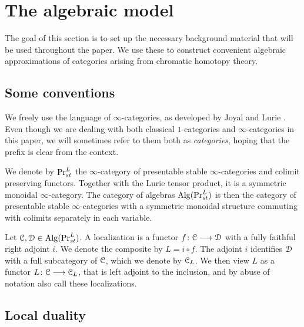 
\section{The algebraic model}

The goal of this section is to set up the necessary background material that will be used throughout the paper. We use these to construct convenient algebraic approximations of categories arising from chromatic homotopy theory. 

\subsection*{Some conventions}

We freely use the language of $\infty$-categories, as developed by Joyal \cite{joyal_02} and Lurie \cite{lurie_09, Lurie_HA}. Even though we are dealing with both classical $1$-categories and $\infty$-categories in this paper, we will sometimes refer to them both as \emph{categories}, hoping that the prefix is clear from the context. 

We denote by $\mathrm{Pr}_{st}^L$ the $\infty$-category of presentable stable $\infty$-categories and colimit preserving functors. Together with the Lurie tensor product, it is a symmetric monoidal $\infty$-category. The category of algebras $\operatorname{Alg}(\mathrm{Pr}_{st}^L)$ is then the category of presentable stable $\infty$-categories with a symmetric monoidal structure commuting with colimits separately in each variable. 

Let $\EuScript{C}, \EuScript{D}\in \operatorname{Alg}(\mathrm{Pr}_{st}^L)$. A localization is a functor $f\colon \EuScript{C}\longrightarrow \EuScript{D}$ with a fully faithful right adjoint $i$. We denote the composite by $L= i\circ f$. The adjoint $i$ identifies $\EuScript{D}$ with a full subcategory of $\EuScript{C}$, which we denote by $\EuScript{C}_L$. We then view $L$ as a functor $L\colon \EuScript{C}\longrightarrow\EuScript{C}_L$, that is left adjoint to the inclusion, and by abuse of notation also call these localizations. 



















\subsection{Local duality}

